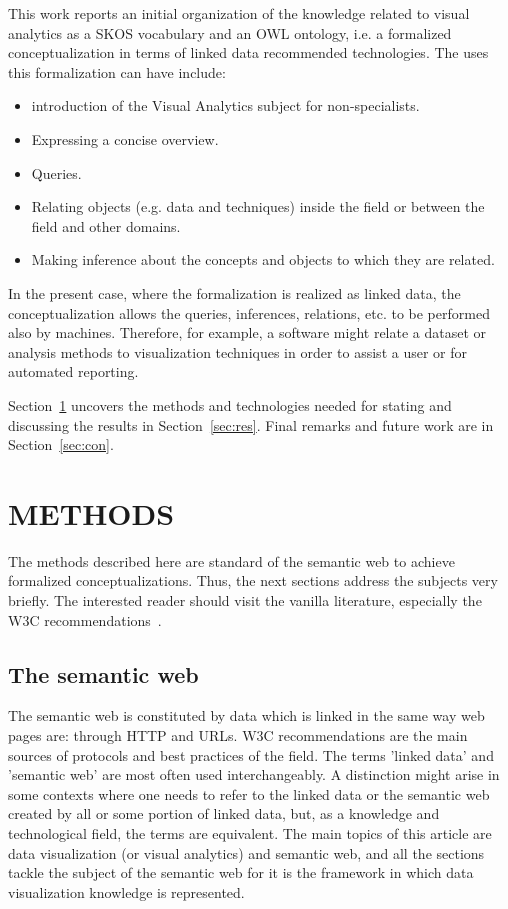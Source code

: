 \documentclass[12pt,fleqn]{article}
\begin{document}
This work reports an initial organization of the knowledge related to visual analytics
as a SKOS vocabulary and an OWL ontology, i.e. a formalized conceptualization
in terms of linked data recommended technologies.
The uses this formalization can have include:
\begin{itemize}
	\item introduction of the Visual Analytics subject for non-specialists.
	\item Expressing a concise overview.
	\item Queries.
	\item Relating objects (e.g. data and techniques) inside the field or between the field and other domains.
	\item Making inference about the concepts and objects to which they are related.
\end{itemize}

In the present case, where the formalization is realized as linked data,
the conceptualization allows the queries, inferences, relations, etc.
to be performed also by machines.
Therefore, for example, a software might relate a dataset
or analysis methods to visualization techniques in order to assist a user or
for automated reporting.

Section~\ref{sec:methods} uncovers the methods and technologies
needed for stating and discussing the results in Section~\ref{sec:res}.
Final remarks and future work are in Section~\ref{sec:con}.

\section{METHODS}\label{sec:methods}
The methods described here are standard of the semantic web
to achieve formalized conceptualizations.
Thus, the next sections address the subjects very briefly.
The interested reader should visit the vanilla literature,
especially the W3C recommendations~\citep{w3cld,ldb}.

\subsection{The semantic web}
The semantic web is constituted by data which is linked in the same way
web pages are: through HTTP and URLs.
W3C recommendations are the main sources of protocols and best practices of the field.
The terms 'linked data' and 'semantic web' are most often used interchangeably.
A distinction might arise in some contexts where one needs to refer to the linked data or
the semantic web created by all or some portion of linked data, but, as a knowledge and technological
field, the terms are equivalent.
The main topics of this article are data visualization (or visual analytics)
and semantic web, and all the sections tackle the subject of the semantic web
for it is the framework in which data visualization knowledge is represented.
\end{document}
